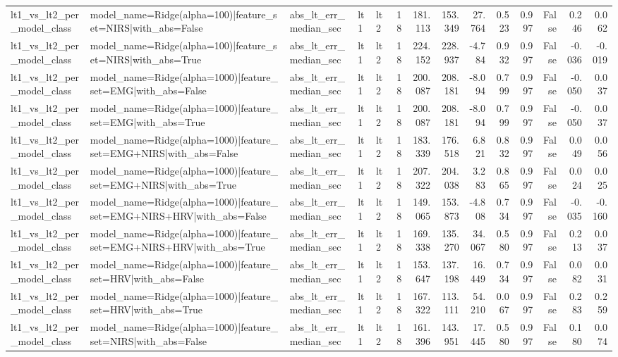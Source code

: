 \begin{table}
\begin{tabular}{lllllrrrrrrrrr}
lt1_vs_lt2_per_model_class & model_name=Ridge(alpha=100)|feature_set=NIRS|with_abs=False & abs_lt_err_median_sec & lt1 & lt2 & 18 & 181.113 & 153.349 & 27.764 & 0.523 & 0.997 & False & 0.246 & 0.062 \\
lt1_vs_lt2_per_model_class & model_name=Ridge(alpha=100)|feature_set=NIRS|with_abs=True & abs_lt_err_median_sec & lt1 & lt2 & 18 & 224.152 & 228.937 & -4.784 & 0.932 & 0.997 & False & -0.036 & -0.019 \\
lt1_vs_lt2_per_model_class & model_name=Ridge(alpha=1000)|feature_set=EMG|with_abs=False & abs_lt_err_median_sec & lt1 & lt2 & 18 & 200.087 & 208.181 & -8.094 & 0.799 & 0.997 & False & -0.050 & 0.037 \\
lt1_vs_lt2_per_model_class & model_name=Ridge(alpha=1000)|feature_set=EMG|with_abs=True & abs_lt_err_median_sec & lt1 & lt2 & 18 & 200.087 & 208.181 & -8.094 & 0.799 & 0.997 & False & -0.050 & 0.037 \\
lt1_vs_lt2_per_model_class & model_name=Ridge(alpha=1000)|feature_set=EMG+NIRS|with_abs=False & abs_lt_err_median_sec & lt1 & lt2 & 18 & 183.339 & 176.518 & 6.821 & 0.832 & 0.997 & False & 0.049 & 0.056 \\
lt1_vs_lt2_per_model_class & model_name=Ridge(alpha=1000)|feature_set=EMG+NIRS|with_abs=True & abs_lt_err_median_sec & lt1 & lt2 & 18 & 207.322 & 204.038 & 3.283 & 0.865 & 0.997 & False & 0.024 & 0.025 \\
lt1_vs_lt2_per_model_class & model_name=Ridge(alpha=1000)|feature_set=EMG+NIRS+HRV|with_abs=False & abs_lt_err_median_sec & lt1 & lt2 & 18 & 149.065 & 153.873 & -4.808 & 0.734 & 0.997 & False & -0.035 & -0.160 \\
lt1_vs_lt2_per_model_class & model_name=Ridge(alpha=1000)|feature_set=EMG+NIRS+HRV|with_abs=True & abs_lt_err_median_sec & lt1 & lt2 & 18 & 169.338 & 135.270 & 34.067 & 0.580 & 0.997 & False & 0.213 & 0.037 \\
lt1_vs_lt2_per_model_class & model_name=Ridge(alpha=1000)|feature_set=HRV|with_abs=False & abs_lt_err_median_sec & lt1 & lt2 & 18 & 153.647 & 137.198 & 16.449 & 0.734 & 0.997 & False & 0.082 & 0.031 \\
lt1_vs_lt2_per_model_class & model_name=Ridge(alpha=1000)|feature_set=HRV|with_abs=True & abs_lt_err_median_sec & lt1 & lt2 & 18 & 167.322 & 113.111 & 54.210 & 0.067 & 0.997 & False & 0.283 & 0.259 \\
lt1_vs_lt2_per_model_class & model_name=Ridge(alpha=1000)|feature_set=NIRS|with_abs=False & abs_lt_err_median_sec & lt1 & lt2 & 18 & 161.396 & 143.951 & 17.445 & 0.580 & 0.997 & False & 0.180 & 0.074 \\

\end{tabular}
\end{table}
